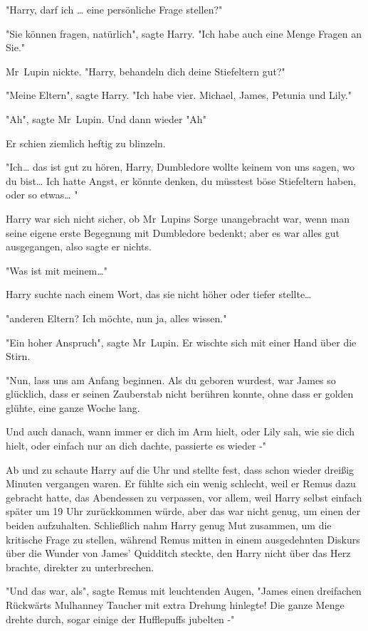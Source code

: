 {"Harry, darf ich … eine persönliche Frage stellen?"

"Sie können fragen, natürlich", sagte Harry. "Ich habe auch eine Menge Fragen an Sie."

Mr~Lupin nickte. "Harry, behandeln dich deine Stiefeltern gut?"

"Meine Eltern", sagte Harry. "Ich habe vier. Michael, James, Petunia und Lily."

"Ah", sagte Mr~Lupin. Und dann wieder "Ah"

Er schien ziemlich heftig zu blinzeln.

"Ich… das ist gut zu hören, Harry, Dumbledore wollte keinem von uns sagen, wo du bist… Ich hatte Angst, er könnte denken, du müsstest böse Stiefeltern haben, oder so etwas… "

Harry war sich nicht sicher, ob Mr~Lupins Sorge unangebracht war, wenn man seine eigene erste Begegnung mit Dumbledore bedenkt; aber es war alles gut ausgegangen, also sagte er nichts.

"Was ist mit meinem…"

Harry suchte nach einem Wort, das sie nicht höher oder tiefer stellte…

"anderen Eltern? Ich möchte, nun ja, alles wissen."

"Ein hoher Anspruch", sagte Mr~Lupin. Er wischte sich mit einer Hand über die Stirn.

"Nun, lass uns am Anfang beginnen. Als du geboren wurdest, war James so glücklich, dass er seinen Zauberstab nicht berühren konnte, ohne dass er golden glühte, eine ganze Woche lang.

Und auch danach, wann immer er dich im Arm hielt, oder Lily sah, wie sie dich hielt, oder einfach nur an dich dachte, passierte es wieder -"

Ab und zu schaute Harry auf die Uhr und stellte fest, dass schon wieder dreißig Minuten vergangen waren. Er fühlte sich ein wenig schlecht, weil er Remus dazu gebracht hatte, das Abendessen zu verpassen, vor allem, weil Harry selbst einfach später um 19 Uhr zurückkommen würde, aber das war nicht genug, um einen der beiden aufzuhalten. Schließlich nahm Harry genug Mut zusammen, um die kritische Frage zu stellen, während Remus mitten in einem ausgedehnten Diskurs über die Wunder von James' Quidditch steckte, den Harry nicht über das Herz brachte, direkter zu unterbrechen.

"Und das war, als", sagte Remus mit leuchtenden Augen, "James einen dreifachen Rückwärts Mulhanney Taucher mit extra Drehung hinlegte! Die ganze Menge drehte durch, sogar einige der Hufflepuffs jubelten -"

}
